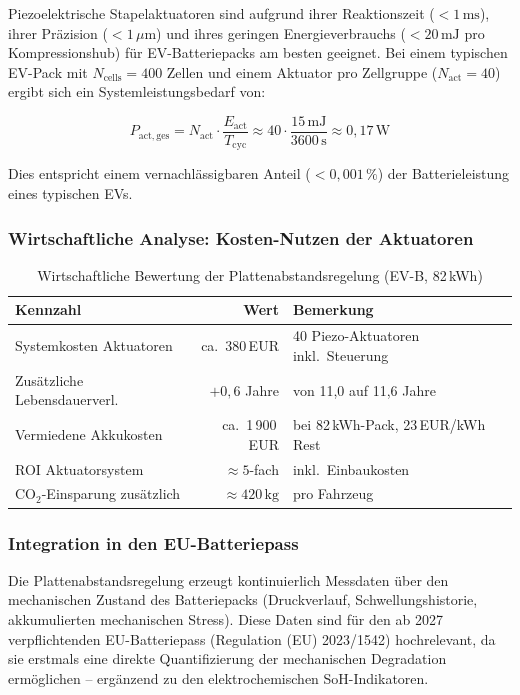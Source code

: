 ﻿\documentclass[12pt,a4paper]{article}
\begin{document}
Piezoelektrische Stapelaktuatoren sind aufgrund ihrer Reaktionszeit
($< 1\,\mathrm{ms}$), ihrer Präzision ($< 1\,\mu\mathrm{m}$) und ihres
geringen Energieverbrauchs ($< 20\,\mathrm{mJ}$ pro Kompressionshub) für
EV-Batteriepacks am besten geeignet. Bei einem typischen EV-Pack mit
$N_\mathrm{cells} = 400$ Zellen und einem Aktuator pro Zellgruppe
($N_\mathrm{act} = 40$) ergibt sich ein Systemleistungsbedarf von:

\begin{equation}
	P_\mathrm{act,ges} = N_\mathrm{act} \cdot \frac{E_\mathrm{act}}{T_\mathrm{cyc}}
	\approx 40 \cdot \frac{15\,\mathrm{mJ}}{3600\,\mathrm{s}} \approx 0{,}17\,\mathrm{W}
	\label{eq:actuator_power}
\end{equation}

Dies entspricht einem vernachlässigbaren Anteil ($< 0{,}001\,\%$) der
Batterieleistung eines typischen EVs.

\subsubsection{Wirtschaftliche Analyse: Kosten-Nutzen der Aktuatoren}

\begin{table}[H]
	\centering
	\caption{Wirtschaftliche Bewertung der Plattenabstandsregelung (EV-B, 82\,kWh)}
	\label{tab:actuator_economics}
	\begin{tabular}{lrl}
		\toprule
		\textbf{Kennzahl} & \textbf{Wert} & \textbf{Bemerkung} \\
		\midrule
		Systemkosten Aktuatoren & ca.\ 380\,EUR & 40 Piezo-Aktuatoren inkl.\ Steuerung \\
		Zusätzliche Lebensdauerverl. & $+0{,}6$ Jahre & von 11{,}0 auf 11{,}6 Jahre \\
		Vermiedene Akkukosten & ca.\ 1\,900\,EUR & bei 82\,kWh-Pack, 23\,EUR/kWh Rest \\
		ROI Aktuatorsystem & $\approx 5$-fach & inkl.\ Einbaukosten \\
		CO$_2$-Einsparung zusätzlich & $\approx 420\,\mathrm{kg}$ & pro Fahrzeug \\
		\bottomrule
	\end{tabular}
\end{table}

\subsubsection{Integration in den EU-Batteriepass}

Die Plattenabstandsregelung erzeugt kontinuierlich Messdaten über den
mechanischen Zustand des Batteriepacks (Druckverlauf, Schwellungshistorie,
akkumulierten mechanischen Stress). Diese Daten sind für den ab 2027
verpflichtenden EU-Batteriepass (Regulation (EU) 2023/1542) hochrelevant,
da sie erstmals eine direkte Quantifizierung der mechanischen Degradation
ermöglichen -- ergänzend zu den elektrochemischen SoH-Indikatoren.
\end{document}
